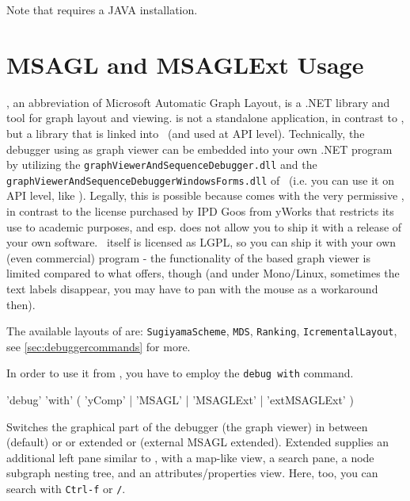 Note that \yComp{} requires a JAVA installation.

\section{MSAGL and MSAGLExt Usage}\label{sec:MSAGL}

\MSAGL{}\cite{MSAGL}, an abbreviation of Microsoft Automatic Graph Layout, is a .NET library and tool for graph layout and viewing.
\MSAGL{} is not a standalone application, in contrast to \yComp{}, but a library that is linked into \GrG\ (and used at API level).
Technically, the debugger using \MSAGL{} as graph viewer can be embedded into your own .NET program by utilizing the \texttt{graph\-Viewer\-And\-Sequence\-Debugger.dll} and the \texttt{graph\-Viewer\-And\-Sequence\-Debugger\-Windows\-Forms.dll} of \GrG\ (i.e. you can use it on API level, like \MSAGL{}).
Legally, this is possible because \MSAGL{} comes with the very permissive \cite{MITLicense}, in contrast to the \yComp{} license purchased by IPD Goos from yWorks that restricts its use to academic purposes, and esp. does not allow you to ship it with a release of your own software.
\GrG\ itself is licensed as LGPL, so you can ship it with your own (even commercial) program - the functionality of the \MSAGL{} based graph viewer is limited compared to what \yComp{} offers, though (and under Mono/Linux, sometimes the text labels disappear, you may have to pan with the mouse as a workaround then).

The available layouts of \MSAGL{} are: \texttt{SugiyamaScheme}, \texttt{MDS}, \texttt{Ranking}, \texttt{IcrementalLayout}, see \ref{sec:debuggercommands} for more.

In order to use it from \GrShell{}, you have to employ the \texttt{debug with} command.
\begin{rail}
  'debug' 'with' ( 'yComp' | 'MSAGL' | 'MSAGLExt' | 'extMSAGLExt' )
\end{rail}
Switches the graphical part of the debugger (the graph viewer) in between \yComp{} (default) or \MSAGL{} or extended \MSAGL{} or \extMSAGLExt{} (external MSAGL extended).
Extended \MSAGL{} supplies an additional left pane similar to \yComp{}, with a map-like view, a search pane, a node subgraph nesting tree, and an attributes/properties view.
Here, too, you can search with \texttt{Ctrl-f} or \texttt{/}.

